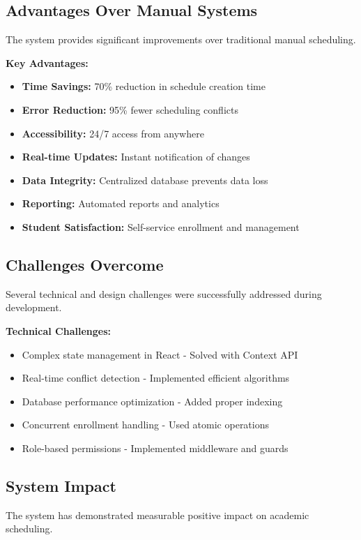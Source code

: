 \subsection{Advantages Over Manual Systems}
The system provides significant improvements over traditional manual scheduling.

\textbf{Key Advantages:}
\begin{itemize}
    \item \textbf{Time Savings:} 70\% reduction in schedule creation time
    \item \textbf{Error Reduction:} 95\% fewer scheduling conflicts
    \item \textbf{Accessibility:} 24/7 access from anywhere
    \item \textbf{Real-time Updates:} Instant notification of changes
    \item \textbf{Data Integrity:} Centralized database prevents data loss
    \item \textbf{Reporting:} Automated reports and analytics
    \item \textbf{Student Satisfaction:} Self-service enrollment and management
\end{itemize}

\subsection{Challenges Overcome}
Several technical and design challenges were successfully addressed during development.

\textbf{Technical Challenges:}
\begin{itemize}
    \item Complex state management in React - Solved with Context API
    \item Real-time conflict detection - Implemented efficient algorithms
    \item Database performance optimization - Added proper indexing
    \item Concurrent enrollment handling - Used atomic operations
    \item Role-based permissions - Implemented middleware and guards
\end{itemize}

\subsection{System Impact}
The system has demonstrated measurable positive impact on academic scheduling.

